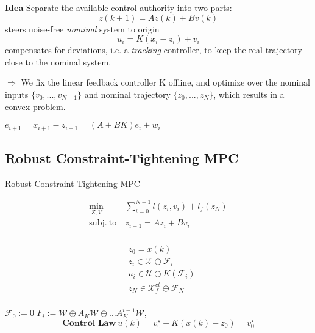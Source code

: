 \textbf{Idea}
Separate the available control authority into two parts:
\[
	z(k+1)=Az(k)+Bv(k)
\]
steers noise-free \textit{nominal} system to origin
\[
	u_i=K(x_i-z_i)+v_i
\]
compensates for deviations,
i.e. a \textit{tracking} controller,
to keep the real trajectory
close to the nominal system.

$\Rightarrow$
We fix the linear feedback controller K offline,
and optimize over the nominal inputs $\{v_0,...,v_{N−1}\}$
and nominal trajectory $\{z_0,...,z_N\}$,
which results in a convex problem.

$e_{i+1} = x_{i+1}-z_{i+1} = (A+BK)e_i+w_i$

\subsection{Robust Constraint-Tightening MPC}
\begin{sstTitleBox}{Robust Constraint-Tightening MPC}
	\begin{sstOnlyFrame}
		\begin{minipage}[t]{0.57\linewidth}
			\[\begin{aligned}
					\min_{Z,V} \         & \sum_{i=0}^{N-1} l(z_i, v_i) + l_f(z_N) \\
					\mathrm{subj.\ to}\  & z_{i+1} = Az_i + Bv_i                   \\
				\end{aligned}\]
		\end{minipage}
		\begin{minipage}[t]{0.4\linewidth}
			\[\begin{aligned}
					 & z_0 = x(k)                                       \\
					 & z_i \in \mathcal{X} \ominus \mathcal{F}_i        \\
					 & u_i \in \mathcal{U} \ominus K(\mathcal{F}_i)     \\
					 & z_N \in \mathcal{X}_f^{ct} \ominus \mathcal{F}_N \\
				\end{aligned}\]
		\end{minipage}

		\vspace{1mm}
		$\mathcal{F}_0:={0}$
		\quad
		$F_i := \mathcal{W}\oplus A_K\mathcal{W}\oplus\dots A_K^{i-1}\mathcal{W}$,
		\[
			\textbf{Control\ Law}\   u(k) = v_0^\star + K(x(k)-z_0) = v_0^\star\]
	\end{sstOnlyFrame}

\end{sstTitleBox}

